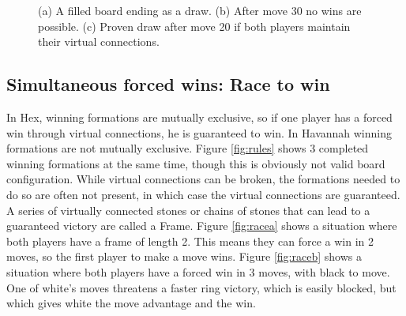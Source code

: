 \begin{figure}
	\centering
	\subfloat[]{\label{fig:drawproven}
		\begin{HavannahBoard}[board size=4,coordinate style=classical,show coordinates=false]
		\HGame{g7,a1,f5,g4,e3,d2,e2,d1,c2,d3,c3,f7,d6,b4,a4,b5,a3,e5,c4,b3}%
		\end{HavannahBoard}
	}
	\caption{(a) A filled board ending as a draw. (b) After move 30 no wins are possible. (c) Proven draw after move 20 if both players maintain their virtual connections.}
	\label{fig:draw}
\end{figure}



\subsection{Simultaneous forced wins: Race to win}

In Hex, winning formations are mutually exclusive, so if one player has a forced win through virtual connections, he is guaranteed to win. In Havannah winning formations are not mutually exclusive. Figure \ref{fig:rules} shows 3 completed winning formations at the same time, though this is obviously not  valid board configuration. While virtual connections can be broken, the formations needed to do so are often not present, in which case the virtual connections are guaranteed. A series of virtually connected stones or chains of stones that can lead to a guaranteed victory are called a Frame. Figure \ref{fig:racea} shows a situation where both players have a frame of length 2. This means they can force a win in 2 moves, so the first player to make a move wins. Figure \ref{fig:raceb} shows a situation where both players have a forced win in 3 moves, with black to move. One of white's moves threatens a faster ring victory, which is easily blocked, but which gives white the move advantage and the win.


